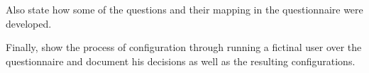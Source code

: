 Also state how some of the questions and their mapping in the questionnaire were developed.

Finally, show the process of configuration through running a fictinal user over the questionnaire and document his decisions as well as the resulting configurations.


%


